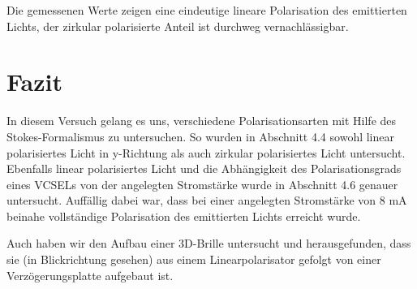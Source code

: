 \documentclass[bigchapter,colorback,accentcolor=tud4b,linedtoc,11pt]{tudreport}
\begin{document}
Die gemessenen Werte zeigen eine eindeutige lineare Polarisation des emittierten Lichts, der zirkular polarisierte Anteil ist durchweg vernachlässigbar.
\begin{center}
\begin{figure}[H]
\end{figure}
\end{center}
\FloatBarrier 

\chapter{Fazit}
In diesem Versuch gelang es uns, verschiedene Polarisationsarten mit Hilfe des Stokes-Formalismus zu untersuchen. So wurden in Abschnitt 4.4 sowohl linear polarisiertes Licht in y-Richtung als auch zirkular polarisiertes Licht untersucht. Ebenfalls linear polarisiertes Licht und die Abhängigkeit des Polarisationsgrads eines VCSELs von der angelegten Stromstärke wurde in Abschnitt 4.6 genauer untersucht. Auffällig dabei war, dass bei einer angelegten Stromstärke von 8 mA beinahe vollständige Polarisation des emittierten Lichts erreicht wurde.

Auch haben wir den Aufbau einer 3D-Brille untersucht und herausgefunden, dass sie (in Blickrichtung gesehen) aus einem Linearpolarisator gefolgt von einer Verzögerungsplatte aufgebaut ist.
\end{document}
